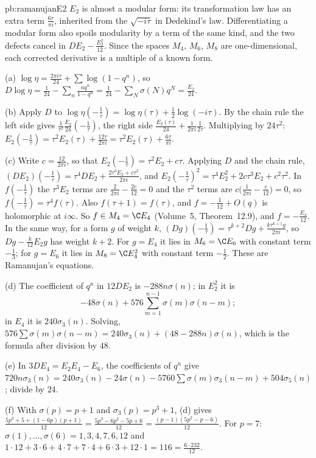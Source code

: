 \begin{solution}{pb:ramanujanE2}
\idea $E_2$ is almost a modular form: its transformation law has an extra term $\frac{6\tau}{\pi i}$, inherited from the $\sqrt{-i\tau}$ in Dedekind's law. Differentiating a modular
form also spoils modularity by a term of the same kind, and the two defects cancel in $DE_2-\frac{E_2^2}{12}$. Since the spaces $M_4$, $M_6$, $M_8$ are one-dimensional, each corrected
derivative is a multiple of a known form.

\writeup (a) $\log\eta=\frac{2\pi i\tau}{24}+\sum\log(1-q^n)$, so $D\log\eta=\frac1{24}-\sum_n\frac{nq^n}{1-q^n}=\frac1{24}-\sum_N\sigma(N)q^N=\frac{E_2}{24}$.

(b) Apply $D$ to $\log\eta(-\frac1\tau)=\log\eta(\tau)+\frac12\log(-i\tau)$. By the chain rule the left side gives $\frac1{\tau^2}\frac{E_2}{24}(-\frac1\tau)$, the right side
$\frac{E_2(\tau)}{24}+\frac1{2\pi i}\frac1{2\tau}$. Multiplying by $24\tau^2$: $E_2(-\frac1\tau)=\tau^2E_2(\tau)+\frac{12\tau}{2\pi i}=\tau^2E_2(\tau)+\frac{6\tau}{\pi i}$.

(c) Write $c=\frac{12}{2\pi i}$, so that $E_2(-\frac1\tau)=\tau^2E_2+c\tau$. Applying $D$ and the chain rule, $(DE_2)(-\frac1\tau)=\tau^4DE_2+\frac{2\tau^3E_2+c\tau^2}{2\pi i}$, and
$E_2(-\frac1\tau)^2=\tau^4E_2^2+2c\tau^3E_2+c^2\tau^2$. In $f(-\frac1\tau)$ the $\tau^3E_2$ terms are $\frac2{2\pi i}-\frac{2c}{12}=0$ and the $\tau^2$ terms are $c\bigl(\frac1{2\pi i}-\frac c{12}\bigr)=0$,
so $f(-\frac1\tau)=\tau^4f(\tau)$. Also $f(\tau+1)=f(\tau)$, and $f=-\frac1{12}+O(q)$ is holomorphic at $i\infty$. So $f\in M_4=\C E_4$ (Volume~5, Theorem~12.9), and $f=-\frac{E_4}{12}$.
In the same way, for a form $g$ of weight $k$, $(Dg)(-\frac1\tau)=\tau^{k+2}Dg+\frac{k\tau^{k+1}g}{2\pi i}$, so $Dg-\frac k{12}E_2g$ has weight $k+2$. For $g=E_4$ it lies in $M_6=\C E_6$
with constant term $-\frac13$; for $g=E_6$ it lies in $M_8=\C E_4^2$ with constant term $-\frac12$. These are Ramanujan's equations.

(d) The coefficient of $q^n$ in $12DE_2$ is $-288n\sigma(n)$; in $E_2^2$ it is
\[
-48\sigma(n)+576\sum_{m=1}^{n-1}\sigma(m)\sigma(n-m);
\]
in $E_4$ it is $240\sigma_3(n)$. Solving,
$576\sum\sigma(m)\sigma(n-m)=240\sigma_3(n)+(48-288n)\sigma(n)$, which is the formula after division by $48$.

(e) In $3DE_4=E_2E_4-E_6$, the coefficients of $q^n$ give $720n\sigma_3(n)=240\sigma_3(n)-24\sigma(n)-5760\sum\sigma(m)\sigma_3(n-m)+504\sigma_5(n)$; divide by $24$.

(f) With $\sigma(p)=p+1$ and $\sigma_3(p)=p^3+1$, (d) gives $\frac{5p^3+5+(1-6p)(p+1)}{12}=\frac{5p^3-6p^2-5p+6}{12}=\frac{(p-1)(5p^2-p-6)}{12}$. For $p=7$: $\sigma(1),\dots,\sigma(6)=1,3,4,7,6,12$ and
$1\cdot12+3\cdot6+4\cdot7+7\cdot4+6\cdot3+12\cdot1=116=\frac{6\cdot232}{12}$.


\end{solution}

